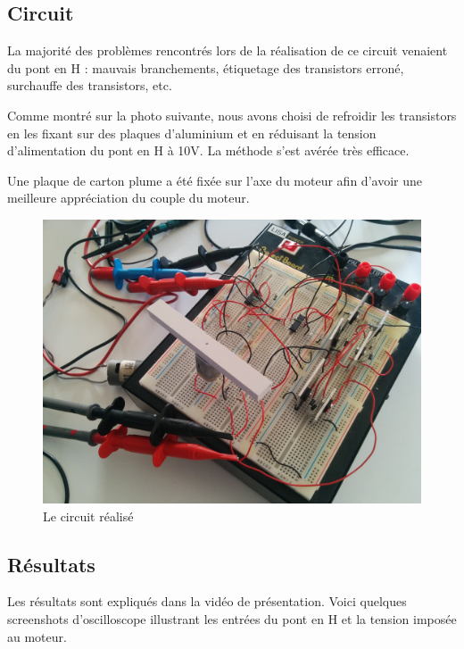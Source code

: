 \documentclass[a4paper]{article}
\begin{document}
\subsection{Circuit}

La majorité des problèmes rencontrés lors de la réalisation de ce circuit venaient du pont en H : mauvais branchements, étiquetage des transistors erroné, surchauffe des transistors, etc.

Comme montré sur la photo suivante, nous avons choisi de refroidir les transistors en les fixant sur des plaques d'aluminium et en réduisant la tension d'alimentation du pont en H à 10V. La méthode s'est avérée très efficace.

Une plaque de carton plume a été fixée sur l'axe du moteur afin d'avoir une meilleure appréciation du couple du moteur.

\begin{figure}[H]
  \centering
    \includegraphics[width=1\textwidth]{circuit}
  \caption{Le circuit réalisé}
\end{figure}

\subsection{Résultats}

Les résultats sont expliqués dans la vidéo de présentation. Voici quelques screenshots d'oscilloscope illustrant les entrées du pont en H et la tension imposée au moteur.
\end{document}
